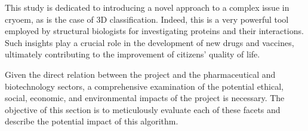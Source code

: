 \documentclass[../main.tex]{subfiles}
\begin{document}
This study is dedicated to introducing a novel approach to a complex issue in \gls{cryoem}, as is the case of 3D classification. Indeed, this is a very powerful tool employed by structural biologists for investigating proteins and their interactions. Such insights play a crucial role in the development of new drugs and vaccines, ultimately contributing to the improvement of citizens' quality of life.

Given the direct relation between the project and the pharmaceutical and biotechnology sectors, a comprehensive examination of the potential ethical, social, economic, and environmental impacts of the project is necessary. The objective of this section is to meticulously evaluate each of these facets and describe the potential impact of this algorithm.
\end{document}
